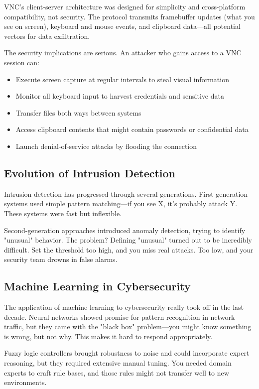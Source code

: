 \documentclass[conference]{IEEEtran}
\begin{document}
VNC's client-server architecture was designed for simplicity and cross-platform compatibility, not security. The protocol transmits framebuffer updates (what you see on screen), keyboard and mouse events, and clipboard data—all potential vectors for data exfiltration.

The security implications are serious. An attacker who gains access to a VNC session can:
\begin{itemize}
\item Execute screen capture at regular intervals to steal visual information
\item Monitor all keyboard input to harvest credentials and sensitive data
\item Transfer files both ways between systems
\item Access clipboard contents that might contain passwords or confidential data
\item Launch denial-of-service attacks by flooding the connection
\end{itemize}

\subsection{Evolution of Intrusion Detection}

Intrusion detection has progressed through several generations. First-generation systems used simple pattern matching—if you see X, it's probably attack Y. These systems were fast but inflexible.

Second-generation approaches introduced anomaly detection, trying to identify "unusual" behavior. The problem? Defining "unusual" turned out to be incredibly difficult. Set the threshold too high, and you miss real attacks. Too low, and your security team drowns in false alarms.

\subsection{Machine Learning in Cybersecurity}

The application of machine learning to cybersecurity really took off in the last decade. Neural networks showed promise for pattern recognition in network traffic, but they came with the "black box" problem—you might know something is wrong, but not why. This makes it hard to respond appropriately.

Fuzzy logic controllers brought robustness to noise and could incorporate expert reasoning, but they required extensive manual tuning. You needed domain experts to craft rule bases, and those rules might not transfer well to new environments.
\end{document}
